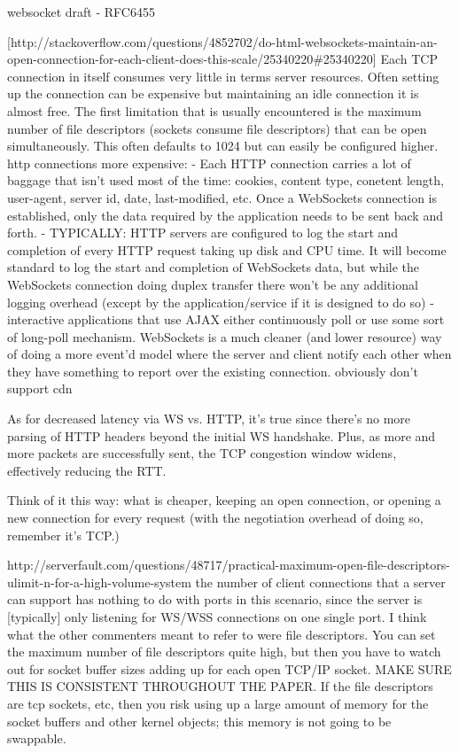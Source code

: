 \documentclass{uvamscse}
\begin{document}
websocket draft - RFC6455

[http://stackoverflow.com/questions/4852702/do-html-websockets-maintain-an-open-connection-for-each-client-does-this-scale/25340220\#25340220]
Each TCP connection in itself consumes very little in terms server resources. Often setting up the connection can be expensive but maintaining an idle connection it is almost free. The first limitation that is usually encountered is the maximum number of file descriptors (sockets consume file descriptors) that can be open simultaneously. This often defaults to 1024 but can easily be configured higher.
http connections more expensive:
- Each HTTP connection carries a lot of baggage that isn't used most of the time: cookies, content type, conetent length, user-agent, server id, date, last-modified, etc. Once a WebSockets connection is established, only the data required by the application needs to be sent back and forth.
- TYPICALLY: HTTP servers are configured to log the start and completion of every HTTP request taking up disk and CPU time. It will become standard to log the start and completion of WebSockets data, but while the WebSockets connection doing duplex transfer there won't be any additional logging overhead (except by the application/service if it is designed to do so)
- interactive applications that use AJAX either continuously poll or use some sort of long-poll mechanism. WebSockets is a much cleaner (and lower resource) way of doing a more event'd model where the server and client notify each other when they have something to report over the existing connection.
obviously don't support cdn

As for decreased latency via WS vs. HTTP, it's true since there's no more parsing of HTTP headers beyond the initial WS handshake. Plus, as more and more packets are successfully sent, the TCP congestion window widens, effectively reducing the RTT.

Think of it this way: what is cheaper, keeping an open connection, or opening a new connection for every request (with the negotiation overhead of doing so, remember it's TCP.)

http://serverfault.com/questions/48717/practical-maximum-open-file-descriptors-ulimit-n-for-a-high-volume-system
the number of client connections that a server can support has nothing to do with ports in this scenario, since the server is [typically] only listening for WS/WSS connections on one single port. I think what the other commenters meant to refer to were file descriptors. You can set the maximum number of file descriptors quite high, but then you have to watch out for socket buffer sizes adding up for each open TCP/IP socket.  MAKE SURE THIS IS CONSISTENT THROUGHOUT THE PAPER.
If the file descriptors are tcp sockets, etc, then you risk using up a large amount of memory for the socket buffers and other kernel objects; this memory is not going to be swappable.
\end{document}
